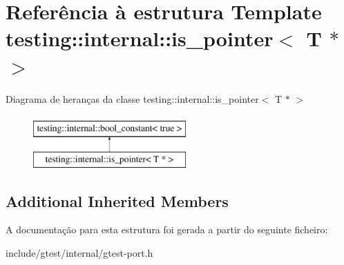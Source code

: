 \hypertarget{structtesting_1_1internal_1_1is__pointer_3_01T_01_5_01_4}{\section{Referência à estrutura Template testing\-:\-:internal\-:\-:is\-\_\-pointer$<$ T $\ast$ $>$}
\label{structtesting_1_1internal_1_1is__pointer_3_01T_01_5_01_4}
}
Diagrama de heranças da classe testing\-:\-:internal\-:\-:is\-\_\-pointer$<$ T $\ast$ $>$\begin{figure}[H]
\begin{center}
\leavevmode
\includegraphics[height=2.000000cm]{structtesting_1_1internal_1_1is__pointer_3_01T_01_5_01_4}
\end{center}
\end{figure}
\subsection*{Additional Inherited Members}


A documentação para esta estrutura foi gerada a partir do seguinte ficheiro\-:\begin{DoxyCompactItemize}
\item 
include/gtest/internal/gtest-\/port.\-h\end{DoxyCompactItemize}
